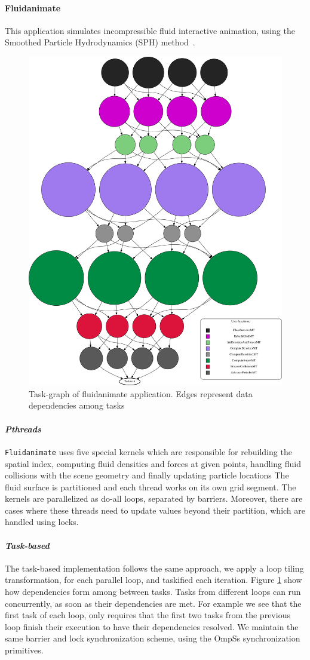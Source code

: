 {\paragraph{\textbf{Fluidanimate}}
This application simulates incompressible fluid interactive animation, using the 
Smoothed Particle Hydrodynamics (SPH) method~\cite{Muller:2003:PFS:846276.846298}.

\begin{figure}[t!]%
	\center
	\includegraphics[width=.6\columnwidth]{task_benchmarks/figures/fluidanimate_taskgraph}%
	\caption{Task-graph of fluidanimate application. Edges represent data dependencies among
tasks}
	\label{fig:fluidanimate_tg}%
	\vspace{.5cm}
\end{figure}

\paragraph{\textit{Pthreads}}
\texttt{Fluidanimate} uses five special kernels which are responsible for rebuilding the
spatial index, computing fluid densities and forces at given points, handling fluid
collisions with the scene geometry and finally updating particle locations The fluid
surface is partitioned and each thread works on its own grid segment.  The kernels are
parallelized as do-all loops, separated by barriers. Moreover, there are cases where these
threads need to update values beyond their partition, which are handled using locks.

\paragraph{\textit{Task-based}}
The task-based implementation follows the same approach, we apply a loop tiling
transformation, for each parallel loop, and taskified each iteration.  
Figure \ref{fig:fluidanimate_tg} show how dependencies form among between tasks.  
Tasks from different loops can run concurrently, as soon as their dependencies are met.
For example we see that the first task of each loop, only requires that the first two tasks
from the previous loop finish their execution to have their dependencies resolved.
We maintain the
same barrier and lock synchronization scheme, using the OmpSs synchronization primitives.

}
